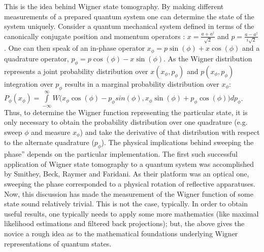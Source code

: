 This is the idea behind Wigner state tomography. By making different measurements of a prepared quantum system one can determine the state of the system uniquely. Consider a quantum mechanical system defined in terms of the canonically conjugate position and momentum operators : $x=\frac{a+a^\dagger}{\sqrt{2}}$ and $p=\frac{a-a^\dagger}{i\sqrt{2}}$. One can then speak of an in-phase operator $x_\phi = p \sin(\phi)+x\cos(\phi)$ and a quadrature operator, $p_\phi = p\cos(\phi)-x\sin(\phi)$. As the Wigner distribution represents a joint probability distribution over $x(x_\phi,p_\phi)$ and $p(x_\phi,p_\phi)$ integration over $p_\phi$ results in a marginal probability distribution over $x_\phi$: $P_\phi(x_\phi)=\int\limits_{-\infty}^{\infty}W\big(x_\phi\cos(\phi)-p_\phi sin(\phi),x_\phi\sin(\phi)+p_\phi\cos(\phi)\big)dp_\phi$. Thus, to determine the Wigner function representing the particular state, it is only necessary to obtain the probability distribution over one quadrature (e.g. sweep $\phi$ and measure $x_\phi$) and take the derivative of that distribution with respect to the alternate quadrature ($p_\phi$). The physical implications behind sweeping the phase'' depends on the particular implementation. The first such successful application of Wigner state tomography to a quantum system was accomplished by Smithey, Beck, Raymer and Faridani. As their platform was an optical one, sweeping the phase corresponded to a physical rotation of reflective apparatuses. Now, this discussion has made the measurement of the Wigner function of some state sound relatively trivial. This is not the case, typically. In order to obtain useful results, one typically needs to apply some more mathematics (like maximal likelihood estimations and filtered back projections); but, the above gives the novice a rough idea as to the mathematical foundations underlying Wigner representations of quantum states.